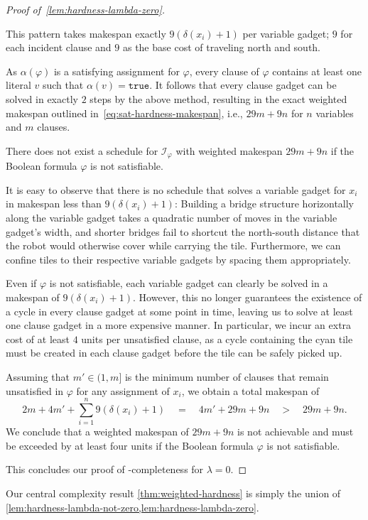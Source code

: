 \begin{proof}[Proof of~\cref{lem:hardness-lambda-zero}]
\begin{claimproof}
		This pattern takes makespan exactly $9(\delta(x_i)+1)$ per variable gadget; $9$ for each incident clause and $9$ as the base cost of traveling north and south.

		As $\alpha(\varphi)$ is a satisfying assignment for $\varphi$, every clause of $\varphi$ contains at least one literal $v$ such that $\alpha(v)=\texttt{true}$.
		It follows that every clause gadget can be solved in exactly $2$ steps by the above method, resulting in the exact weighted makespan outlined in~\cref{eq:sat-hardness-makespan}, i.e., $29m+9n$ for $n$ variables and $m$ clauses.
	\end{claimproof}
	\begin{claim}
		There does not exist a schedule for $\mathcal{I}_\varphi$ with weighted makespan $29m+9n$ if the Boolean formula $\varphi$ is not satisfiable.
	\end{claim}
	\begin{claimproof}
		It is easy to observe that there is no schedule that solves a variable gadget for $x_i$ in makespan less than ${9(\delta(x_i)+1)}$:
		Building a bridge structure horizontally along the variable gadget takes a quadratic number of moves in the variable gadget's width, and shorter bridges fail to shortcut the north-south distance that the robot would otherwise cover while carrying the tile.
		Furthermore, we can confine tiles to their respective variable gadgets by spacing them appropriately.

		Even if $\varphi$ is not satisfiable, each variable gadget can clearly be solved in a makespan of ${9(\delta(x_i)+1)}$.
		However, this no longer guarantees the existence of a cycle in every clause gadget at some point in time, leaving us to solve at least one clause gadget in a more expensive manner.
		In particular, we incur an extra cost of at least $4$ units per unsatisfied clause, as a cycle containing the cyan tile must be created in each clause gadget before the tile can be safely picked up.

		Assuming that $m'\in (1,m]$ is the minimum number of clauses that remain unsatisfied in $\varphi$ for any assignment of $x_i$, we obtain a total makespan of
		\begin{equation}
			\label{eq:hardness-teleportation-greedy}
			2m+4m'+\sum_{i=1}^{n}9(\delta(x_i)+1)\quad =\quad 4m'+29m+9n\quad >\quad 29m+9n.
		\end{equation}
		We conclude that a weighted makespan of $29m+9n$ is not achievable and must be exceeded by at least four units if the Boolean formula $\varphi$ is not satisfiable.
	\end{claimproof}
	This concludes our proof of \NP-completeness for $\lambda=0$.
\end{proof}

Our central complexity result \cref{thm:weighted-hardness} is simply the union of \cref{lem:hardness-lambda-not-zero,lem:hardness-lambda-zero}.

